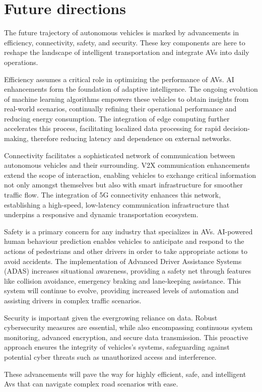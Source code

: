 \documentclass[10pt,oneside,english,a4paper]{article}
\begin{document}
\section{Future directions} \label{future}
\par The future trajectory of autonomous vehicles is marked by advancements in efficiency, connectivity, safety, and security. These key components are here to reshape the landscape of intelligent transportation and integrate AVs into daily operations.
\par Efficiency assumes a critical role in optimizing the performance of AVs. AI enhancements form the foundation of adaptive intelligence. The ongoing evolution of machine learning algorithms empowers these vehicles to obtain insights from real-world scenarios, continually refining their operational performance and reducing energy consumption. The integration of edge computing further accelerates this process, facilitating localized data processing for rapid decision-making, therefore reducing latency and dependence on external networks.  
\par Connectivity facilitates a sophisticated network of communication between autonomous vehicles and their surrounding. V2X communication enhancements extend the scope of interaction, enabling vehicles to exchange critical information not only amongst themselves but also with smart infrastructure for smoother traffic flow. The integration of 5G connectivity enhances this network, establishing a high-speed, low-latency communication infrastructure that underpins a responsive and dynamic transportation ecosystem.
\par Safety is a primary concern for any industry that specializes in AVs. AI-powered human behaviour prediction enables vehicles to anticipate and respond to the actions of pedestrians and other drivers in order to take appropriate actions to avoid accidents. The implementation of Advanced Driver Assistance Systems (ADAS) increases situational awareness, providing a safety net through features like collision avoidance, emergency braking and lane-keeping assistance. This system will continue to evolve, providing increased levels of automation and assisting drivers in complex traffic scenarios.
\par Security is important given the evergrowing reliance on data. Robust cybersecurity measures are essential, while also encompassing continuous system monitoring, advanced encryption, and secure data transmission. This proactive approach ensures the integrity of vehicles's systems, safeguarding against potential cyber threats such as unauthorized access and interference.
\par These advancements will pave the way for highly efficient, safe, and intelligent Avs that can navigate complex road scenarios with ease.\cite{Communicationsecurity, edgecomputing, stateoftheart, understanding}
\end{document}
